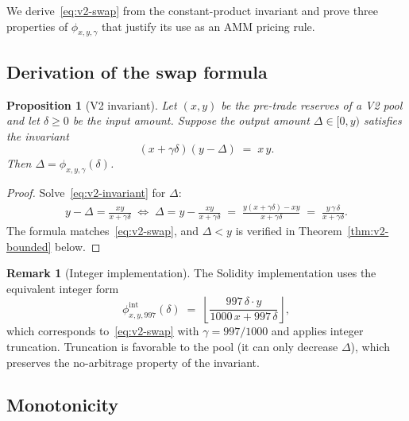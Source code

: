 \documentclass[11pt,a4paper]{article}
\newtheorem{proposition}[theorem]{Proposition}
\theoremstyle{definition}
\newtheorem{remark}[theorem]{Remark}
\begin{document}
We derive~\eqref{eq:v2-swap} from the constant-product invariant and prove three
properties of $\phi_{x,y,\gamma}$ that justify its use as an AMM pricing rule.

\subsection{Derivation of the swap formula}

\begin{proposition}[V2 invariant]
\label{prop:v2-invariant}
Let $(x,y)$ be the pre-trade reserves of a V2 pool and let $\delta \geq 0$ be the
input amount. Suppose the output amount $\Delta \in [0, y)$ satisfies the
invariant
\begin{equation}
    (x + \gamma \delta)(y - \Delta) \;=\; x\,y.
    \label{eq:v2-invariant}
\end{equation}
Then $\Delta = \phi_{x,y,\gamma}(\delta)$.
\end{proposition}

\begin{proof}
Solve~\eqref{eq:v2-invariant} for $\Delta$:
\begin{align*}
    y - \Delta = \frac{xy}{x + \gamma\delta}
    \;\iff\;
    \Delta = y - \frac{xy}{x + \gamma\delta}
    \;=\; \frac{y(x + \gamma\delta) - xy}{x + \gamma\delta}
    \;=\; \frac{y\,\gamma\,\delta}{x + \gamma\delta}.
\end{align*}
The formula matches~\eqref{eq:v2-swap}, and $\Delta < y$ is verified in
Theorem~\ref{thm:v2-bounded} below.
\end{proof}

\begin{remark}[Integer implementation]
\label{rem:integer-rounding}
The Solidity implementation uses the equivalent integer form
\begin{equation}
    \phi^{\mathrm{int}}_{x,y,997}(\delta) \;=\; \left\lfloor
        \frac{997 \, \delta \cdot y}{1000\,x + 997\,\delta}
    \right\rfloor,
    \label{eq:v2-int}
\end{equation}
which corresponds to~\eqref{eq:v2-swap} with $\gamma = 997/1000$ and applies
integer truncation. Truncation is favorable to the pool (it can only decrease
$\Delta$), which preserves the no-arbitrage property of the invariant.
\end{remark}

\subsection{Monotonicity}
\end{document}

